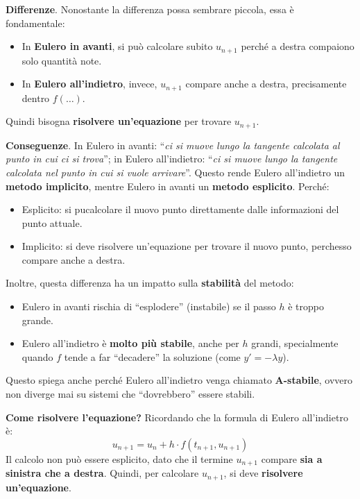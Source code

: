 \begin{itemize}
    \highspace
    \textbf{Differenze}. Nonostante la differenza possa sembrare piccola, essa è fondamentale:
    \begin{itemize}
        \item In \textbf{Eulero in avanti}, si può calcolare subito $u_{n+1}$ perché a destra compaiono solo quantità note.
        \item In \textbf{Eulero all'indietro}, invece, $u_{n+1}$ compare anche a destra, precisamente dentro $f(\dots)$.
    \end{itemize}
    Quindi bisogna \textbf{risolvere un'equazione} per trovare $u_{n+1}$.

    \highspace
    \textbf{Conseguenze}. In Eulero in avanti: ``\emph{ci si muove lungo la tangente calcolata al punto in cui ci si trova}''; in Eulero all'indietro: ``\emph{ci si muove lungo la tangente calcolata nel punto in cui si vuole arrivare}''. Questo rende Eulero all'indietro un \textbf{metodo implicito}, mentre Eulero in avanti \eaccent un \textbf{metodo esplicito}. Perché:
    \begin{itemize}
        \item Esplicito: si pu\oaccent calcolare il nuovo punto direttamente dalle informazioni del punto attuale.
        \item Implicito: si deve risolvere un'equazione per trovare il nuovo punto, perch\eaccent esso compare anche a destra.
    \end{itemize}
    Inoltre, questa differenza ha un impatto sulla \textbf{stabilità} del metodo:
    \begin{itemize}
        \item Eulero in avanti rischia di ``esplodere'' (instabile) se il passo $h$ è troppo grande.
        \item Eulero all'indietro è \textbf{molto più stabile}, anche per $h$ grandi, specialmente quando $f$ tende a far ``decadere'' la soluzione (come $y' = -\lambda y$).
    \end{itemize}
    Questo spiega anche perché Eulero all'indietro venga chiamato \textbf{A-stabile}, ovvero non diverge mai su sistemi che ``dovrebbero'' essere stabili.

    \highspace
    \textbf{Come risolvere l'equazione?} Ricordando che la formula di Eulero all'indietro è:
    \begin{equation*}
        u_{n+1} = u_n + h \cdot f(t_{n+1}, u_{n+1})
    \end{equation*}
    Il calcolo non può essere esplicito, dato che il termine $u_{n+1}$ compare \textbf{sia a sinistra che a destra}. Quindi, per calcolare $u_{n+1}$, si deve \textbf{risolvere un'equazione}.


\end{itemize}
